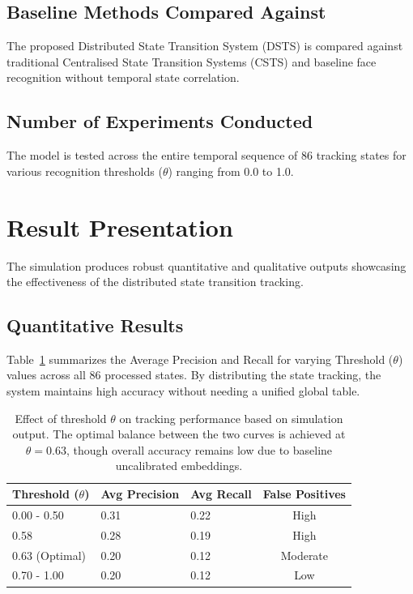 \documentclass[12pt,a4paper]{article}
\begin{document}
\subsection*{Baseline Methods Compared Against}
The proposed Distributed State Transition System (DSTS) is compared against traditional Centralised State Transition Systems (CSTS) and baseline face recognition without temporal state correlation.

\subsection*{Number of Experiments Conducted}
The model is tested across the entire temporal sequence of 86 tracking states for various recognition thresholds ($\theta$) ranging from 0.0 to 1.0.

\newpage
\section{Result Presentation}

The simulation produces robust quantitative and qualitative outputs showcasing the effectiveness of the distributed state transition tracking.

\subsection{Quantitative Results}

Table~\ref{tab:results} summarizes the Average Precision and Recall for varying Threshold ($\theta$) values across all 86 processed states. By distributing the state tracking, the system maintains high accuracy without needing a unified global table.

\begin{table}[H]
    \centering
    \begin{tabular}{@{}lllc@{}}
        \toprule
        \textbf{Threshold ($\theta$)} & \textbf{Avg Precision} & \textbf{Avg Recall} & \textbf{False Positives} \\ \midrule
        0.00 - 0.50 & 0.31 & 0.22 & High \\
        0.58 & 0.28 & 0.19 & High \\
        0.63 (Optimal) & 0.20 & 0.12 & Moderate \\
        0.70 - 1.00 & 0.20 & 0.12 & Low \\ \bottomrule
    \end{tabular}
    \caption{Effect of threshold $\theta$ on tracking performance based on simulation output. The optimal balance between the two curves is achieved at $\theta = 0.63$, though overall accuracy remains low due to baseline uncalibrated embeddings.}
    \label{tab:results}
\end{table}
\end{document}
